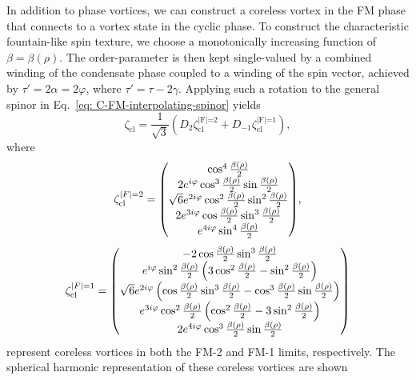 In addition to phase vortices, we can construct a coreless vortex in the FM
phase that connects to a vortex state in the cyclic phase.
To construct the characteristic fountain-like spin texture, we choose a
monotonically increasing function of \(\beta=\beta(\rho)\).
The order-parameter is then kept single-valued by a combined winding of the
condensate phase coupled to a winding of the spin vector, achieved by
\(\tau'=2\alpha=2\varphi \), where \(\tau'=\tau-2\gamma \).
Applying such a rotation to the general spinor in
Eq.~\eqref{eq: C-FM-interpolating-spinor} yields
\begin{equation}\label{eq: C-FM-coreless-general}
    \zeta_\text{cl} = \frac{1}{\sqrt{3}}\left(D_2\zeta^\text{|F|=2}_\text{cl}
    + D_{-1}\zeta^\text{|F|=1}_\text{cl}\right),
\end{equation}
where
\begin{align}\label{eq: C-FM-coreless-FM-limits}
    \zeta^{|F|=2}_\text{cl} =
    \mqty(
    \cos^4\frac{\beta(\rho)}{2}                                        \\
    2e^{i\varphi}\cos^3\frac{\beta(\rho)}{2}\sin\frac{\beta(\rho)}{2}  \\
    \sqrt{6}e^{2i\varphi}\cos^2\frac{\beta(\rho)}{2}\sin^2
    \frac{\beta(\rho)}{2}                                              \\
    2e^{3i\varphi}\cos\frac{\beta(\rho)}{2}\sin^3\frac{\beta(\rho)}{2} \\
    e^{4i\varphi}\sin^4\frac{\beta(\rho)}{2}
    ),
\end{align}
\begin{align}
    \zeta^{|F|=1}_\text{cl} =
    \mqty(
    -2\cos\frac{\beta(\rho)}{2}\sin^3\frac{\beta(\rho)}{2}         \\
    e^{i\varphi}\sin^2\frac{\beta(\rho)}{2}\left(3\cos^2
    \frac{\beta(\rho)}{2}-\sin^2\frac{\beta(\rho)}{2}\right)       \\
    \sqrt{6}e^{2i\varphi}\left(\cos\frac{\beta(\rho)}{2}\sin^3
    \frac{\beta(\rho)}{2}
    - \cos^3\frac{\beta(\rho)}{2}\sin\frac{\beta(\rho)}{2} \right) \\
    e^{3i\varphi}\cos^2\frac{\beta(\rho)}{2}\left(\cos^2
    \frac{\beta(\rho)}{2}-3\sin^2\frac{\beta(\rho)}{2}\right)      \\
    2e^{4i\varphi}\cos^3\frac{\beta(\rho)}{2}\sin\frac{\beta(\rho)}{2}
    )
\end{align}
represent coreless vortices in both the FM-2 and FM-1 limits, respectively.
The spherical harmonic representation of these coreless vortices are shown
